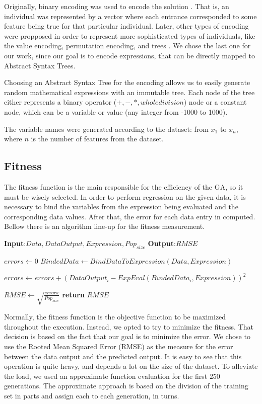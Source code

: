 \documentclass[runningheads]{llncs}
\begin{document}

Originally, binary encoding was used to encode the solution \cite{whitley1994genetic}. That is, an individual was represented by a vector where each entrance corresponded to some feature being true for that particular individual. Later, other types of encoding were propposed in order to represent more sophisticated types of individuals, like the value encoding, permutation encoding, and trees \cite{martins2016gacuda}. We chose the last one for our work, since our goal is to encode expressions, that can be directly mapped to Abstract Syntax Trees.

Choosing an Abstract Syntax Tree for the encoding allows us to easily generate random mathematical expressions with an immutable tree. Each node of the tree either represents a binary operator ($+,-,*,whole division$) node or a constant node, which can be a variable or value (any integer from -1000 to 1000).

The variable names were generated according to the dataset: from $x_{1}$ to $x_{n}$, where $n$ is the number of features from the dataset.

\subsection{Fitness}

The fitness function is the main responsible for the efficiency of the GA, so it must be wisely selected. In order to perform regression on the given data, it is necessary to bind the variables from the expression being evaluated and the corresponding data values. After that, the error for each data entry in computed. Bellow there is an algorithm line-up for the fitness measurement.

\begin{algorithmic}

   \State \textbf{Input}:$Data,DataOutput,Expression,Pop_{size}$
   \State \textbf{Output}:$RMSE$
   
   \State $errors \gets 0$
   \State $BindedData \gets BindDataToExpression(Data,Expression)$
   
      \State $errors \gets errors + (DataOutput_{i} - ExpEval(BindedData_{i},Expression))^2$
   \EndFor
   
   \State $RMSE \gets \sqrt{\frac{errors}{Pop_{size}}}$
   \State \textbf{return} $RMSE$
\end{algorithmic}

Normally, the fitness function is the objective function to be maximized throughout the execution. Instead, we opted to try to minimize the fitness. That decision is based on the fact that our goal is to minimize the error. We chose to use the Rooted Mean Squared Error (RMSE) as the measure for the error between the data output and the predicted output. It is easy to see that this operation is quite heavy, and depends a lot on the size of the dataset. To alleviate the load, we used an approximate function evaluation \cite{beasley1993overview} for the first $250$ generations. The approximate approach is based on the division of the training set in parts and assign each to each generation, in turns.
\end{document}
